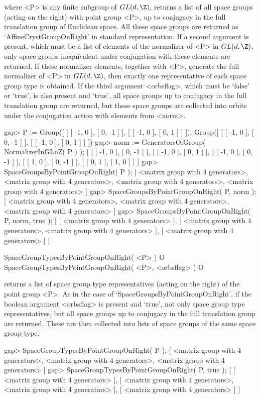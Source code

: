 where <P> is any finite subgroup of $GL(d,\Z)$, returns a list of 
all space groups (acting on the right) with point group <P>, up to 
conjugacy in the full translation group of Euclidean space. All 
these space groups are returned as `AffineCrystGroupOnRight' in 
standard representation.  If a second argument is present, which must 
be a list of elements of the normalizer of <P> in $GL(d,\Z)$, only 
space groups inequivalent under conjugation with these elements are 
returned.  If these normalizer elements, together with <P>, generate 
the full normalizer of <P> in $GL(d,\Z)$, then exactly one 
representative of each space group type is obtained. 
If the third argument <orbsflag>, which must be `false' or `true',
is also present and `true', all space groups up to conjugacy in
the full translation group are returned, but these space groups are 
collected into orbits under the conjugation action with elements from
<norm>.

\beginexample
gap> P := Group([ [ [ -1, 0 ], [ 0, -1 ] ], [ [ -1, 0 ], [ 0, 1 ] ] ]);
Group([ [ [ -1, 0 ], [ 0, -1 ] ], [ [ -1, 0 ], [ 0, 1 ] ] ])
gap> norm := GeneratorsOfGroup( NormalizerInGLnZ( P ) );
[ [ [ -1, 0 ], [ 0, -1 ] ], [ [ -1, 0 ], [ 0, 1 ] ], [ [ -1, 0 ], [ 0, -1 ] ],
  [ [ 1, 0 ], [ 0, -1 ] ], [ [ 0, 1 ], [ 1, 0 ] ] ]
gap> SpaceGroupsByPointGroupOnRight( P );
[ <matrix group with 4 generators>, <matrix group with 4 generators>, 
  <matrix group with 4 generators>, <matrix group with 4 generators> ]
gap> SpaceGroupsByPointGroupOnRight( P, norm );
[ <matrix group with 4 generators>, <matrix group with 4 generators>, 
  <matrix group with 4 generators> ]
gap> SpaceGroupsByPointGroupOnRight( P, norm, true );
[ [ <matrix group with 4 generators> ], 
  [ <matrix group with 4 generators>, <matrix group with 4 generators> ], 
  [ <matrix group with 4 generators> ] ]
\endexample

\>SpaceGroupTypesByPointGroupOnRight( <P> ) O
\>SpaceGroupTypesByPointGroupOnRight( <P>, <orbsflag> ) O

returns a list of space group type representatives (acting on the right) 
of the point group <P>. As in the case of `SpaceGroupsByPointGroupOnRight',
if the boolean argument <orbsflag> is present and `true', not only space
group type representatives, but all space groups up to conjugacy in
the full translation group are returned. These are then collected 
into lists of space groups of the same space group type.

\beginexample
gap> SpaceGroupTypesByPointGroupOnRight( P );
[ <matrix group with 4 generators>, <matrix group with 4 generators>, 
  <matrix group with 4 generators> ]
gap> SpaceGroupTypesByPointGroupOnRight( P, true );
[ [ <matrix group with 4 generators> ], 
  [ <matrix group with 4 generators>, <matrix group with 4 generators> ], 
  [ <matrix group with 4 generators> ] ]
\endexample

